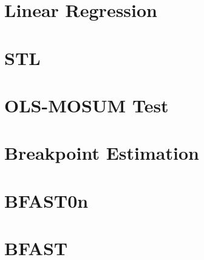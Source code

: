 \documentclass[main.tex]{subfiles}
\begin{document}
\section{Linear Regression}
\label{sec:linear_regression}

\section{STL}
\label{sec:impl_stl}

\section{OLS-MOSUM Test}
\label{sec:impl_mosum}


\section{Breakpoint Estimation}
\label{sec:impl_breakpoints}

\section{BFAST0n}
\label{sec:impl_bfast0n}

\section{BFAST}
\label{sec:bfast}

\biblio
\end{document}
